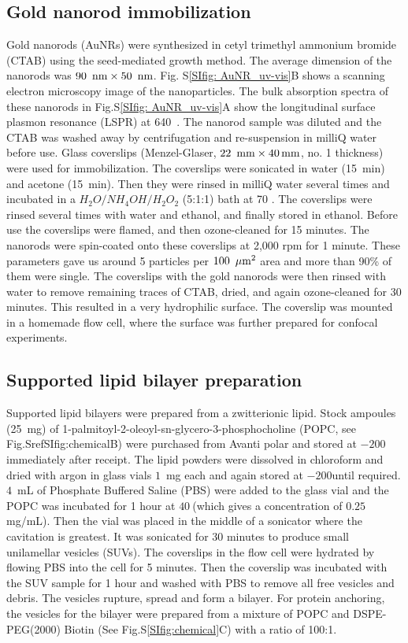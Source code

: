 \subsection{Gold nanorod immobilization}
Gold nanorods (AuNRs) were synthesized in cetyl trimethyl ammonium bromide (CTAB) using the seed-mediated growth method.\cite{nikoobakht2003preparation} The average dimension of the nanorods was $90~\,\textrm{nm}\times50~\,\textrm{nm}$. Fig. S\ref{SIfig: AuNR_uv-vis}B shows a scanning electron microscopy image of the nanoparticles. The bulk absorption spectra of these nanorods in Fig.S\ref{SIfig: AuNR_uv-vis}A show the longitudinal surface plasmon resonance (LSPR) at 640~\nm. The nanorod sample was diluted and the CTAB was washed away by centrifugation and re-suspension in milliQ water before use. Glass coverslips (Menzel-Glaser, $22~\,\textrm{mm}\times 40\,\textrm{mm}$, no. 1 thickness) were used for immobilization. The coverslips were sonicated in water (15~min) and acetone (15~min). Then they were rinsed in milliQ water several times and incubated in a $H_2O/NH_4OH/H_2O_2$ (5:1:1) bath at 70 \degree. The coverslips were rinsed several times with water and ethanol, and finally stored in ethanol. Before use the coverslips were flamed, and then ozone-cleaned for 15 minutes. The nanorods were spin-coated onto these coverslips at 2,000 rpm for 1 minute. These parameters gave us around 5 particles per $100~\,\mu\textrm{m}^2$ area and more than 90\% of them were single. The coverslips with the gold nanorods were then rinsed with water to remove remaining traces of CTAB, dried, and again ozone-cleaned for 30 minutes. This resulted in a very  hydrophilic surface. The coverslip was mounted in a homemade flow cell, where the surface was further prepared for confocal experiments.
\subsection{Supported lipid bilayer preparation}
Supported lipid bilayers were prepared from a zwitterionic lipid. Stock ampoules (25~mg) of 1-palmitoyl-2-oleoyl-sn-glycero-3-phosphocholine (POPC, see Fig.Sref{SIfig:chemical}B) were purchased from Avanti polar and stored at $-200$\degree immediately after receipt. The lipid powders were dissolved in chloroform and dried with argon in glass vials $1$~mg each and again stored at $-200$\degree until required. $4$~mL of Phosphate Buffered Saline (PBS) were added to the glass vial and the POPC was incubated for 1 hour at $40~$\degree (which gives a concentration of $0.25~$mg/mL). Then the vial was placed in the middle of a sonicator where the cavitation is greatest. It was sonicated for 30 minutes to produce small unilamellar vesicles (SUVs). The coverslips in the flow cell were hydrated by flowing PBS into the cell for 5 minutes. Then the coverslip was incubated with the SUV sample for 1 hour and washed with PBS to remove all free vesicles and debris. The vesicles rupture, spread and form a bilayer.\cite{richter2006formation} For protein anchoring, the vesicles for the bilayer were prepared from a mixture of POPC and DSPE-PEG(2000) Biotin (See Fig.S\ref{SIfig:chemical}C) with a ratio of 100:1.
